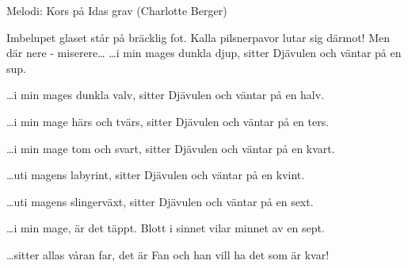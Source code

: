 \begin{song}

\begin{songmeta}
Melodi: Kors på Idas grav (Charlotte Berger)
\end{songmeta}

\begin{songtext}
Imbelupet glaset står på bräcklig fot.
Kalla pilsnerpavor lutar sig därmot!
Men där nere - miserere\ldots
\ldots{}i min mages dunkla djup,
sitter Djävulen och väntar på en sup.

\ldots{}i min mages dunkla valv,
sitter Djävulen och väntar på en halv.

\ldots{}i min mage härs och tvärs,
sitter Djävulen och väntar på en ters.

\ldots{}i min mage tom och svart,
sitter Djävulen och väntar på en kvart.

\ldots{}uti magens labyrint,
sitter Djävulen och väntar på en kvint.

\ldots{}uti magens slingerväxt,
sitter Djävulen och väntar på en sext.

\ldots{}i min mage, är det täppt.
Blott i sinnet vilar minnet av en sept.

\ldots{}sitter allas våran far,
det är Fan och han vill ha det som är kvar!
\end{songtext}

\end{song}
